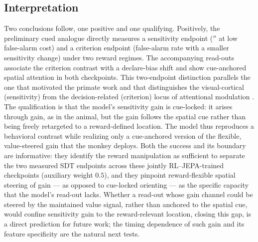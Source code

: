 \subsection*{Interpretation}

Two conclusions follow, one positive and one qualifying. Positively, the preliminary
cued analogue directly measures a sensitivity endpoint ($\dprime$ at low false-alarm
cost) and a criterion endpoint (false-alarm rate with a smaller sensitivity change)
under two reward regimes. The accompanying read-outs associate the criterion contrast
with a declare-bias shift and show cue-anchored spatial attention in both checkpoints.
This two-endpoint distinction parallels the one that motivated the primate work and that
distinguishes the visual-cortical (sensitivity) from the decision-related (criterion)
locus of attentional modulation \cite{luo_maunsell2018_criterion_sensitivity,CohenMaunsell2009}. The qualification is
that the model's sensitivity gain is cue-locked: it arises through gain, as in the
animal, but the gain follows the spatial cue rather than being freely retargeted to a
reward-defined location. The model thus reproduces a behavioral contrast while realizing only a cue-anchored
version of the flexible, value-steered gain that the monkey
deploys. Both the success and its boundary are informative: they identify the reward
manipulation as sufficient to separate the two measured SDT endpoints across these
jointly RL--JEPA-trained checkpoints (auxiliary weight $0.5$), and they pinpoint reward-flexible spatial steering of gain --- as
opposed to cue-locked orienting --- as the specific capacity that the model's
read-out lacks. Whether a read-out whose gain channel could be steered by the
maintained value signal, rather than anchored to the spatial cue, would confine
sensitivity gain to the reward-relevant location, closing this gap, is
a direct prediction for future work; the timing dependence of such gain
\cite{ghose_maunsell2002_task_timing} and its feature specificity
\cite{treue_martinez_trujillo1999_feature_attention} are the natural next tests.
